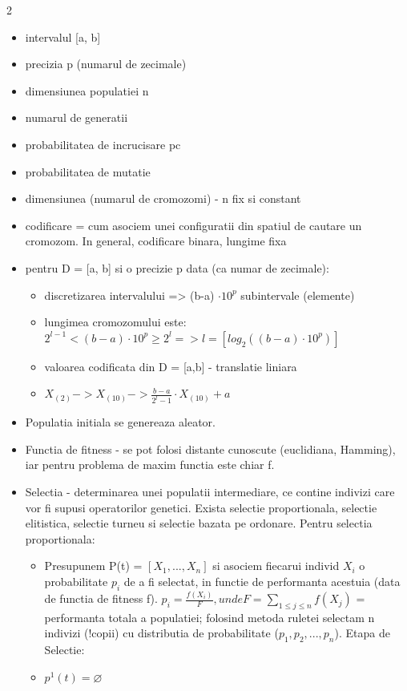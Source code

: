 \documentclass[a4paper]{article}
\begin{document}
\begin{multicols}{2}
\begin{itemize}
    \item intervalul [a, b]
    \item precizia p (numarul de zecimale)
    \item dimensiunea populatiei n
    \item numarul de generatii
    \item probabilitatea de incrucisare pc
    \item probabilitatea de mutatie
    \item dimensiunea (numarul de cromozomi) - n fix si constant
    \item codificare = cum asociem unei configuratii din spatiul de cautare un cromozom. In general, codificare binara, lungime fixa
    \item pentru D = [a, b] si o precizie p data (ca numar de zecimale):
    \begin{itemize}
    \item discretizarea intervalului => (b-a) $\cdot 10^p$ subintervale (elemente)
    \item lungimea cromozomului este: $2^{l-1} < (b-a) \cdot 10^p \geq 2^l => l = [log_2((b-a) \cdot 10^p)]$
    \item valoarea codificata din D = [a,b] - translatie liniara
    \item $X_{(2)} -> X_{(10)} -> \frac{b-a}{2^l-1} \cdot X_{(10)} + a$
    \end{itemize}
    \item Populatia initiala se genereaza aleator.
    \item Functia de fitness - se pot folosi distante cunoscute (euclidiana, Hamming), iar pentru problema de maxim functia este chiar f.
    \item Selectia - determinarea unei populatii intermediare, ce contine indivizi care vor fi supusi operatorilor genetici. Exista selectie proportionala, selectie elitistica, selectie turneu si selectie bazata pe ordonare. Pentru selectia proportionala:
    \begin{itemize}
    \item Presupunem P(t) = $[X_1,..., X_n]$ si asociem fiecarui individ $X_i$ o probabilitate $p_i$ de a fi selectat, in functie de performanta acestuia (data de functia de fitness f). $p_i = \frac{f(X_i)}{F}, unde F = \sum_{1 \leq j \leq n} f(X_j)$ = performanta totala a populatiei; folosind metoda ruletei selectam n indivizi (!copii) cu distributia de probabilitate ($p_1, p_2,...,p_n$). Etapa de Selectie:
    \item $p^1(t) = \varnothing$

\end{itemize}
\end{itemize}
\end{multicols}
\end{document}
